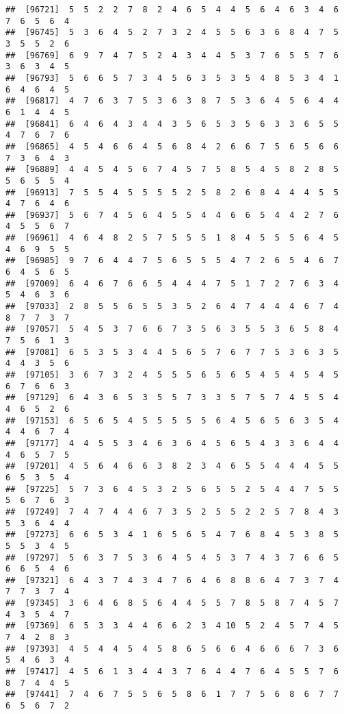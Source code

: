 \documentclass[
]{book}
\begin{document}
\begin{verbatim}
##  [96721]  5  5  2  2  7  8  2  4  6  5  4  4  5  6  4  6  3  4  6  7  6  5  6  4
##  [96745]  5  3  6  4  5  2  7  3  2  4  5  5  6  3  6  8  4  7  5  3  5  5  2  6
##  [96769]  6  9  7  4  7  5  2  4  3  4  4  5  3  7  6  5  5  7  6  3  6  3  4  5
##  [96793]  5  6  6  5  7  3  4  5  6  3  5  3  5  4  8  5  3  4  1  6  4  6  4  5
##  [96817]  4  7  6  3  7  5  3  6  3  8  7  5  3  6  4  5  6  4  4  6  1  4  4  5
##  [96841]  6  4  6  4  3  4  4  3  5  6  5  3  5  6  3  3  6  5  5  4  7  6  7  6
##  [96865]  4  5  4  6  6  4  5  6  8  4  2  6  6  7  5  6  5  6  6  7  3  6  4  3
##  [96889]  4  4  5  4  5  6  7  4  5  7  5  8  5  4  5  8  2  8  5  5  6  5  5  4
##  [96913]  7  5  5  4  5  5  5  5  2  5  8  2  6  8  4  4  4  5  5  4  7  6  4  6
##  [96937]  5  6  7  4  5  6  4  5  5  4  4  6  6  5  4  4  2  7  6  4  5  5  6  7
##  [96961]  4  6  4  8  2  5  7  5  5  5  1  8  4  5  5  5  6  4  5  4  6  9  5  5
##  [96985]  9  7  6  4  4  7  5  6  5  5  5  4  7  2  6  5  4  6  7  6  4  5  6  5
##  [97009]  6  4  6  7  6  6  5  4  4  4  7  5  1  7  2  7  6  3  4  5  4  6  3  6
##  [97033]  2  8  5  5  6  5  5  3  5  2  6  4  7  4  4  4  6  7  4  8  7  7  3  7
##  [97057]  5  4  5  3  7  6  6  7  3  5  6  3  5  5  3  6  5  8  4  7  5  6  1  3
##  [97081]  6  5  3  5  3  4  4  5  6  5  7  6  7  7  5  3  6  3  5  4  4  3  5  6
##  [97105]  3  6  7  3  2  4  5  5  5  6  5  6  5  4  5  4  5  4  5  6  7  6  6  3
##  [97129]  6  4  3  6  5  3  5  5  7  3  3  5  7  5  7  4  5  5  4  4  6  5  2  6
##  [97153]  6  5  6  5  4  5  5  5  5  5  6  4  5  6  5  6  3  5  4  4  4  6  7  4
##  [97177]  4  4  5  5  3  4  6  3  6  4  5  6  5  4  3  3  6  4  4  4  6  5  7  5
##  [97201]  4  5  6  4  6  6  3  8  2  3  4  6  5  5  4  4  4  5  5  6  5  3  5  4
##  [97225]  5  7  3  6  4  5  3  2  5  6  5  5  2  5  4  4  7  5  5  5  6  7  6  3
##  [97249]  7  4  7  4  4  6  7  3  5  2  5  5  2  2  5  7  8  4  3  5  3  6  4  4
##  [97273]  6  6  5  3  4  1  6  5  6  5  4  7  6  8  4  5  3  8  5  5  5  3  4  5
##  [97297]  5  6  3  7  5  3  6  4  5  4  5  3  7  4  3  7  6  6  5  6  6  5  4  6
##  [97321]  6  4  3  7  4  3  4  7  6  4  6  8  8  6  4  7  3  7  4  7  7  3  7  4
##  [97345]  3  6  4  6  8  5  6  4  4  5  5  7  8  5  8  7  4  5  7  4  3  5  4  7
##  [97369]  6  5  3  3  4  4  6  6  2  3  4 10  5  2  4  5  7  4  5  7  4  2  8  3
##  [97393]  4  5  4  4  5  4  5  8  6  5  6  6  4  6  6  6  7  3  6  5  4  6  3  4
##  [97417]  4  5  6  1  3  4  4  3  7  6  4  4  7  6  4  5  5  7  6  8  7  4  4  5
##  [97441]  7  4  6  7  5  5  6  5  8  6  1  7  7  5  6  8  6  7  7  6  5  6  7  2

\end{verbatim}
\end{document}
